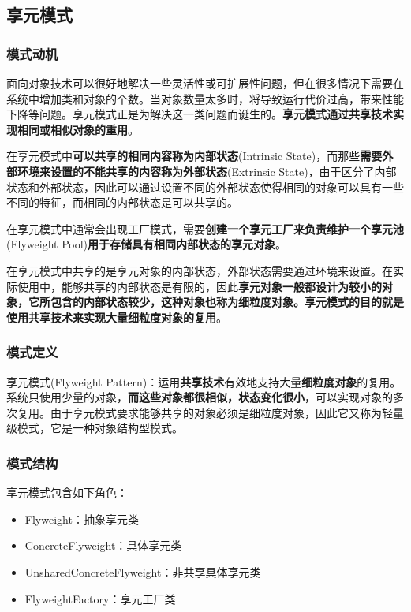 \subsection{享元模式}

\subsubsection{模式动机}

面向对象技术可以很好地解决一些灵活性或可扩展性问题，但在很多情况下需要在系统中增加类和对象的个数。当对象数量太多时，将导致运行代价过高，带来性能下降等问题。享元模式正是为解决这一类问题而诞生的。\textbf{享元模式通过共享技术实现相同或相似对象的重用}。

在享元模式中\textbf{可以共享的相同内容称为内部状态}(Intrinsic State)，而那些\textbf{需要外部环境来设置的不能共享的内容称为外部状态}(Extrinsic State)，由于区分了内部状态和外部状态，因此可以通过设置不同的外部状态使得相同的对象可以具有一些不同的特征，而相同的内部状态是可以共享的。

在享元模式中通常会出现工厂模式，需要\textbf{创建一个享元工厂来负责维护一个享元池}(Flyweight Pool)\textbf{用于存储具有相同内部状态的享元对象}。

在享元模式中共享的是享元对象的内部状态，外部状态需要通过环境来设置。在实际使用中，能够共享的内部状态是有限的，因此\textbf{享元对象一般都设计为较小的对象，它所包含的内部状态较少，这种对象也称为细粒度对象。享元模式的目的就是使用共享技术来实现大量细粒度对象的复用}。

\subsubsection{模式定义}
享元模式(Flyweight Pattern)：运用\textbf{共享技术}有效地支持大量\textbf{细粒度对象}的复用。系统只使用少量的对象，\textbf{而这些对象都很相似，状态变化很小}，可以实现对象的多次复用。由于享元模式要求能够共享的对象必须是细粒度对象，因此它又称为轻量级模式，它是一种对象结构型模式。

\subsubsection{模式结构}
享元模式包含如下角色：
\begin{itemize}
    \item Flyweight：抽象享元类
    \item ConcreteFlyweight：具体享元类
    \item UnsharedConcreteFlyweight：非共享具体享元类
    \item FlyweightFactory：享元工厂类
\end{itemize}


